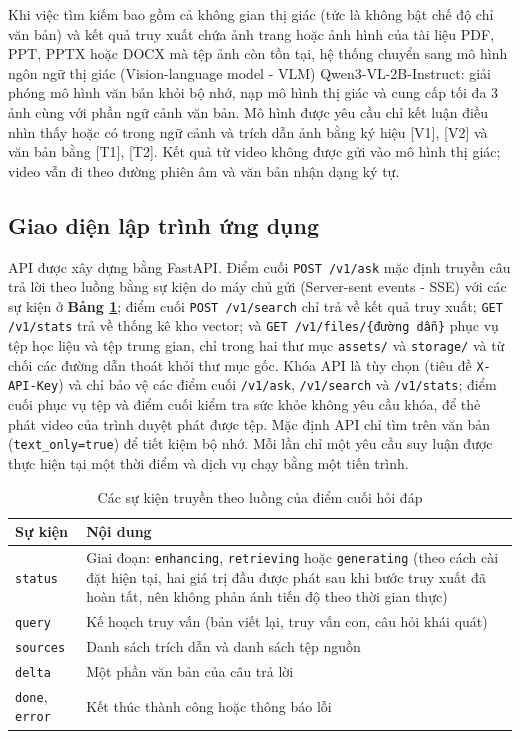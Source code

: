 Khi việc tìm kiếm bao gồm cả không gian thị giác (tức là không bật chế độ chỉ văn bản) và kết quả truy xuất chứa ảnh trang hoặc ảnh hình của tài liệu PDF, PPT, PPTX hoặc DOCX mà tệp ảnh còn tồn tại, hệ thống chuyển sang mô hình ngôn ngữ thị giác (Vision-language model - VLM) Qwen3-VL-2B-Instruct: giải phóng mô hình văn bản khỏi bộ nhớ, nạp mô hình thị giác và cung cấp tối đa 3 ảnh cùng với phần ngữ cảnh văn bản. Mô hình được yêu cầu chỉ kết luận điều nhìn thấy hoặc có trong ngữ cảnh và trích dẫn ảnh bằng ký hiệu [V1], [V2] và văn bản bằng [T1], [T2]. Kết quả từ video không được gửi vào mô hình thị giác; video vẫn đi theo đường phiên âm và văn bản nhận dạng ký tự.

\subsection{Giao diện lập trình ứng dụng}\label{sec:api}

API được xây dựng bằng FastAPI. Điểm cuối \texttt{POST /v1/ask} mặc định truyền câu trả lời theo luồng bằng sự kiện do máy chủ gửi (Server-sent events - SSE) với các sự kiện ở \textbf{Bảng \ref{tab:sse}}; điểm cuối \texttt{POST /v1/search} chỉ trả về kết quả truy xuất; \texttt{GET /v1/stats} trả về thống kê kho vector; và \texttt{GET /v1/files/\{đường dẫn\}} phục vụ tệp học liệu và tệp trung gian, chỉ trong hai thư mục \texttt{assets/} và \texttt{storage/} và từ chối các đường dẫn thoát khỏi thư mục gốc. Khóa API là tùy chọn (tiêu đề \texttt{X-API-Key}) và chỉ bảo vệ các điểm cuối \texttt{/v1/ask}, \texttt{/v1/search} và \texttt{/v1/stats}; điểm cuối phục vụ tệp và điểm cuối kiểm tra sức khỏe không yêu cầu khóa, để thẻ phát video của trình duyệt phát được tệp. Mặc định API chỉ tìm trên văn bản (\texttt{text\_only=true}) để tiết kiệm bộ nhớ. Mỗi lần chỉ một yêu cầu suy luận được thực hiện tại một thời điểm và dịch vụ chạy bằng một tiến trình.

\begin{table}[ht]
    \centering
    \caption{Các sự kiện truyền theo luồng của điểm cuối hỏi đáp}
    \label{tab:sse}
    \begin{tabular}{|l|p{10cm}|}
    \hline
    \textbf{Sự kiện} & \textbf{Nội dung} \\
    \hline
    \texttt{status} & Giai đoạn: \texttt{enhancing}, \texttt{retrieving} hoặc \texttt{generating} (theo cách cài đặt hiện tại, hai giá trị đầu được phát sau khi bước truy xuất đã hoàn tất, nên không phản ánh tiến độ theo thời gian thực) \\
    \hline
    \texttt{query} & Kế hoạch truy vấn (bản viết lại, truy vấn con, câu hỏi khái quát) \\
    \hline
    \texttt{sources} & Danh sách trích dẫn và danh sách tệp nguồn \\
    \hline
    \texttt{delta} & Một phần văn bản của câu trả lời \\
    \hline
    \texttt{done}, \texttt{error} & Kết thúc thành công hoặc thông báo lỗi \\
    \hline
    \end{tabular}
\end{table}

